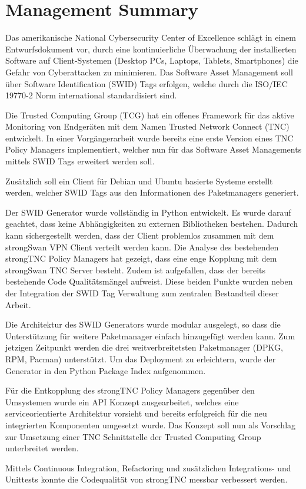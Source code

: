 \chapter{Management Summary}


Das amerikanische National Cybersecurity Center of Excellence schlägt in einem
Entwurfsdokument vor, durch eine kontinuierliche Überwachung der installierten
Software auf Client-Systemen (Desktop PCs, Laptops, Tablets, Smartphones) die
Gefahr von Cyberattacken zu minimieren. Das Software Asset Management soll über
Software Identification (SWID) Tags erfolgen, welche durch die ISO/IEC
19770-2\cite{iso19770-2} Norm international standardisiert sind.

Die Trusted Computing Group (TCG) hat ein offenes Framework für das aktive
Monitoring von Endgeräten mit dem Namen Trusted Network Connect (TNC)
entwickelt. In einer Vorgängerarbeit wurde bereits eine erste Version eines TNC
Policy Managers implementiert, welcher nun für das Software Asset Managements
mittels SWID Tags erweitert werden soll.

Zusätzlich soll ein Client für Debian und Ubuntu basierte Systeme erstellt
werden, welcher SWID Tags aus den Informationen des Paketmanagers generiert.


Der SWID Generator wurde vollständig in Python entwickelt. Es wurde darauf
geachtet, dass keine Abhängigkeiten zu externen Bibliotheken bestehen. Dadurch
kann sichergestellt werden, dass der Client problemlos zusammen mit dem
strongSwan VPN Client verteilt werden kann. Die Analyse des bestehenden
strongTNC Policy Managers hat gezeigt, dass eine enge Kopplung mit dem
strongSwan TNC Server besteht. Zudem ist aufgefallen, dass der bereits
bestehende Code Qualitätsmängel aufweist. Diese beiden Punkte wurden neben der
Integration der SWID Tag Verwaltung zum zentralen Bestandteil dieser Arbeit.


Die Architektur des SWID Generators wurde modular ausgelegt, so dass die
Unterstützung für weitere Paketmanager einfach hinzugefügt werden kann. Zum
jetzigen Zeitpunkt werden die drei weitverbreitetsten Paketmanager (DPKG,
RPM, Pacman) unterstützt. Um das Deployment zu erleichtern, wurde der Generator
in den Python Package Index aufgenommen.

Für die Entkopplung des strongTNC Policy Managers gegenüber den Umsystemen wurde
ein API Konzept ausgearbeitet, welches eine serviceorientierte Architektur
vorsieht und bereits erfolgreich für die neu integrierten Komponenten umgesetzt
wurde. Das Konzept soll nun als Vorschlag zur Umsetzung einer TNC Schnittstelle
der Trusted Computing Group unterbreitet werden.

Mittels Continuous Integration, Refactoring und zusätzlichen Integrations- und
Unittests konnte die Codequalität von strongTNC messbar verbessert werden.

